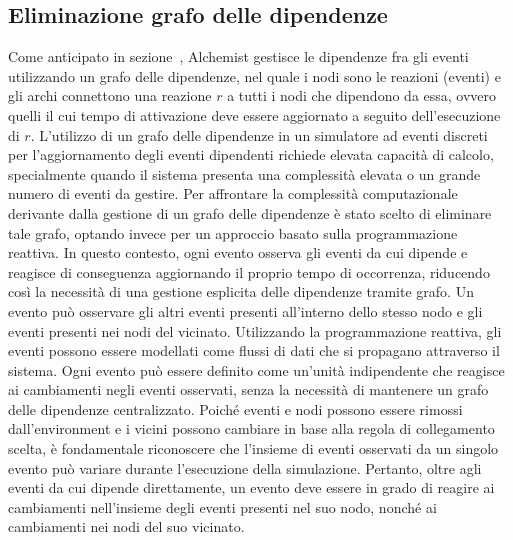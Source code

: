 \documentclass[12pt,a4paper,openright,twoside]{book}
\begin{document}
\subsection{Eliminazione grafo delle dipendenze}
Come anticipato in sezione~, Alchemist gestisce le dipendenze fra gli eventi utilizzando un grafo delle dipendenze, nel quale i nodi sono le reazioni (eventi) e gli archi connettono una reazione $r$ a tutti i nodi che dipendono da essa, ovvero quelli il cui tempo di attivazione deve essere aggiornato a seguito dell'esecuzione di $r$. 
L'utilizzo di un grafo delle dipendenze in un simulatore ad eventi discreti per l'aggiornamento degli eventi dipendenti richiede elevata capacità di calcolo, specialmente quando il sistema presenta una complessità elevata o un grande numero di eventi da gestire.
Per affrontare la complessità computazionale derivante dalla gestione di un grafo delle dipendenze è stato scelto di eliminare tale grafo, optando invece per un approccio basato sulla programmazione reattiva. In questo contesto, ogni evento osserva gli eventi da cui dipende e reagisce di conseguenza aggiornando il proprio tempo di occorrenza, riducendo così la necessità di una gestione esplicita delle dipendenze tramite grafo. Un evento può osservare gli altri eventi presenti all'interno dello stesso nodo e gli eventi presenti nei nodi del vicinato. 
Utilizzando la programmazione reattiva, gli eventi possono essere modellati come flussi di dati che si propagano attraverso il sistema. Ogni evento può essere definito come un'unità indipendente che reagisce ai cambiamenti negli eventi osservati, senza la necessità di mantenere un grafo delle dipendenze centralizzato. 
Poiché eventi e nodi possono essere rimossi dall'environment e i vicini possono cambiare in base alla regola di collegamento scelta, è fondamentale riconoscere che l'insieme di eventi osservati da un singolo evento può variare durante l'esecuzione della simulazione. Pertanto, oltre agli eventi da cui dipende direttamente, un evento deve essere in grado di reagire ai cambiamenti nell'insieme degli eventi presenti nel suo nodo, nonché ai cambiamenti nei nodi del suo vicinato.  
\end{document}
